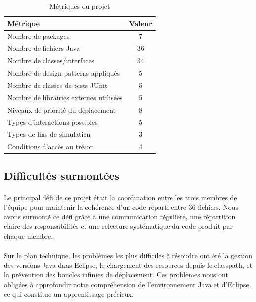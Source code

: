 \begin{table}[h!]
\centering
\renewcommand{\arraystretch}{1.4}
\begin{tabular}{|l|c|}
\hline
\textbf{Métrique} & \textbf{Valeur} \\
\hline
Nombre de packages & 7 \\
Nombre de fichiers Java & 36 \\
Nombre de classes/interfaces & 34 \\
Nombre de design patterns appliqués & 5 \\
Nombre de classes de tests JUnit & 5 \\
Nombre de librairies externes utilisées & 5 \\
Niveaux de priorité du déplacement & 8 \\
Types d'interactions possibles & 5 \\
Types de fins de simulation & 3 \\
Conditions d'accès au trésor & 4 \\
\hline
\end{tabular}
\caption{Métriques du projet}
\label{tab:bilan}
\end{table}

\bigskip

\subsection{Difficultés surmontées}

\paragraph{} Le principal défi de ce projet était la coordination entre les trois membres de l'équipe pour maintenir la cohérence d'un code réparti entre 36 fichiers. Nous avons surmonté ce défi grâce à une communication régulière, une répartition claire des responsabilités et une relecture systématique du code produit par chaque membre.

\paragraph{} Sur le plan technique, les problèmes les plus difficiles à résoudre ont été la gestion des versions Java dans Eclipse, le chargement des resources depuis le classpath, et la prévention des boucles infinies de déplacement. Ces problèmes nous ont obligées à approfondir notre compréhension de l'environnement Java et d'Eclipse, ce qui constitue un apprentissage précieux.

